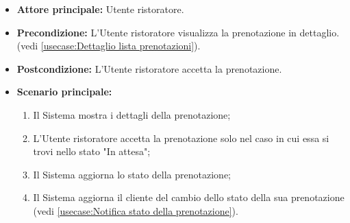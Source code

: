 \label{usecase:Accetta prenotazione}
\begin{itemize}
	\item \textbf{Attore principale:} Utente ristoratore.

	\item \textbf{Precondizione:} L'Utente ristoratore visualizza la prenotazione in dettaglio. (vedi \autoref{usecase:Dettaglio lista prenotazioni}).

	\item \textbf{Postcondizione:} L'Utente ristoratore accetta la prenotazione.


	\item \textbf{Scenario principale:}
	      \begin{enumerate}
		      \item Il Sistema mostra i dettagli della prenotazione;
		      \item L'Utente ristoratore accetta la prenotazione solo nel caso in cui essa si trovi nello stato "In attesa";
		      \item Il Sistema aggiorna lo stato della prenotazione;
		      \item Il Sistema aggiorna il cliente del cambio dello stato della sua prenotazione (vedi \autoref{usecase:Notifica stato della prenotazione}).

	      \end{enumerate}
\end{itemize}
